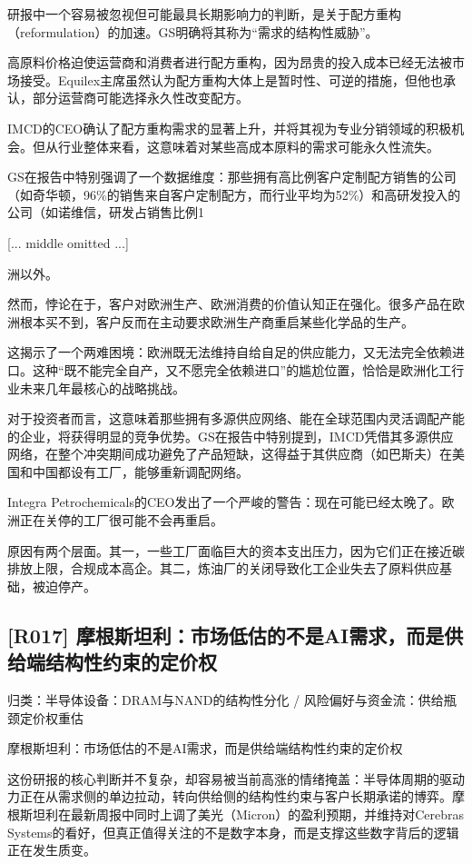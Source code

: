 \documentclass[11pt]{ctexart}
\begin{document}
研报中一个容易被忽视但可能最具长期影响力的判断，是关于配方重构（reformulation）的加速。GS明确将其称为“需求的结构性威胁”。

高原料价格迫使运营商和消费者进行配方重构，因为昂贵的投入成本已经无法被市场接受。Equilex主席虽然认为配方重构大体上是暂时性、可逆的措施，但他也承认，部分运营商可能选择永久性改变配方。

IMCD的CEO确认了配方重构需求的显著上升，并将其视为专业分销领域的积极机会。但从行业整体来看，这意味着对某些高成本原料的需求可能永久性流失。

GS在报告中特别强调了一个数据维度：那些拥有高比例客户定制配方销售的公司（如奇华顿，96\%的销售来自客户定制配方，而行业平均为52\%）和高研发投入的公司（如诺维信，研发占销售比例1

[... middle omitted ...]

洲以外。

然而，悖论在于，客户对欧洲生产、欧洲消费的价值认知正在强化。很多产品在欧洲根本买不到，客户反而在主动要求欧洲生产商重启某些化学品的生产。

这揭示了一个两难困境：欧洲既无法维持自给自足的供应能力，又无法完全依赖进口。这种“既不能完全自产，又不愿完全依赖进口”的尴尬位置，恰恰是欧洲化工行业未来几年最核心的战略挑战。

对于投资者而言，这意味着那些拥有多源供应网络、能在全球范围内灵活调配产能的企业，将获得明显的竞争优势。GS在报告中特别提到，IMCD凭借其多源供应网络，在整个冲突期间成功避免了产品短缺，这得益于其供应商（如巴斯夫）在美国和中国都设有工厂，能够重新调配网络。

Integra Petrochemicals的CEO发出了一个严峻的警告：现在可能已经太晚了。欧洲正在关停的工厂很可能不会再重启。

原因有两个层面。其一，一些工厂面临巨大的资本支出压力，因为它们正在接近碳排放上限，合规成本高企。其二，炼油厂的关闭导致化工企业失去了原料供应基础，被迫停产。

\subsection{[R017] 摩根斯坦利：市场低估的不是AI需求，而是供给端结构性约束的定价权}
{\small\color{refgray}归类：半导体设备：DRAM与NAND的结构性分化 / 风险偏好与资金流：供给瓶颈定价权重估}

摩根斯坦利：市场低估的不是AI需求，而是供给端结构性约束的定价权

这份研报的核心判断并不复杂，却容易被当前高涨的情绪掩盖：半导体周期的驱动力正在从需求侧的单边拉动，转向供给侧的结构性约束与客户长期承诺的博弈。摩根斯坦利在最新周报中同时上调了美光（Micron）的盈利预期，并维持对Cerebras Systems的看好，但真正值得关注的不是数字本身，而是支撑这些数字背后的逻辑正在发生质变。
\end{document}
